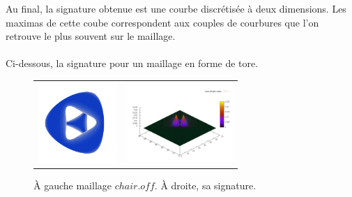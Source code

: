 \documentclass{llncs}
\begin{document}
Au final, la signature obtenue est une courbe discrétisée à deux dimensions. Les maximas de cette coube correspondent aux couples de courbures que l'on retrouve le plus souvent sur le maillage.
\\\\
Ci-dessous, la signature pour un maillage en forme de tore.
\begin{figure}[tb]
    \centering
    \begin{tabular}{cc}
      \includegraphics[width=3cm]{img/chair.png} &
      \includegraphics[width=4cm]{img/chair_taubin.png} \\
    \end{tabular}
    \caption{\`A gauche maillage $chair.off$. \`A droite, sa signature.}
\end{figure}
\end{document}
